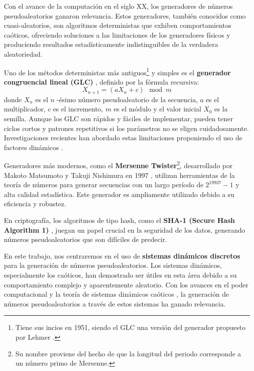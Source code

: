 \documentclass[../Main.tex]{subfiles}
\begin{document}
Con el avance de la computación en el siglo XX, los generadores de números pseudoaleatorios ganaron relevancia. Estos generadores, también conocidos como cuasi-aleatorios, son algoritmos deterministas que exhiben comportamientos caóticos, ofreciendo soluciones a las limitaciones de los generadores físicos y produciendo resultados estadísticamente indistinguibles de la verdadera aleatoriedad.

Uno de los métodos deterministas más antiguos\footnote{Tiene sus incios en 1951, siendo el GLC una versión  del generador propuesto por Lehmer \cite{Lehmer1951}.} y simples es el \textbf{generador congruencial lineal (GLC)} \cite{Lehmer1951,Knuth1997,BaltazarLarios2024}, definido por la fórmula recursiva:
\[ X_{n+1} = (aX_n + c) \mod m \]
donde $X_n$ es el $n$ -ésimo número pseudoaleatorio de la secuencia, \(a\) es el multiplicador, \(c\) es el incremento, \(m\) es el módulo y el valor inicial $X_0$ es la semilla. Aunque los GLC son rápidos y fáciles de implementar, pueden tener ciclos cortos y patrones repetitivos si los parámetros no se eligen cuidadosamente. Investigaciones recientes han abordado estas limitaciones proponiendo el uso de factores dinámicos \cite{Alhomdy2015}.

Generadores más modernos, como el \textbf{Mersenne Twister}\footnote{Su nombre proviene del hecho de que la longitud del periodo corresponde a un número primo de Mersenne.}, desarrollado por Makoto Matsumoto y Takuji Nishimura en 1997 \cite{Matsumoto1998}, utilizan herramientas de la teoría de números para generar secuencias con un largo período 
de \(2^{19937}-1\) y alta calidad estadística. Este generador es ampliamente utilizado debido a su eficiencia y robustez.

En criptografía, los algoritmos de tipo hash, como el \textbf{SHA-1 (Secure Hash Algorithm 1)} \cite{Eastlake2001}, juegan un papel crucial en la seguridad de los datos, generando números pseudoaleatorios que son difíciles de predecir.

En este trabajo, nos centraremos en el uso de \textbf{sistemas dinámicos discretos} para la generación de números pseudoaleatorios. Los sistemas dinámicos, especialmente los caóticos, han demostrado ser útiles en esta área debido a su comportamiento complejo y aparentemente aleatorio. Con los avances en el poder computacional y la teoría de sistemas dinámicos caóticos \cite{Behnia2011,Szczepanski2001}, la generación de números pseudoaleatorios a través de estos sistemas ha ganado relevancia.
\end{document}
